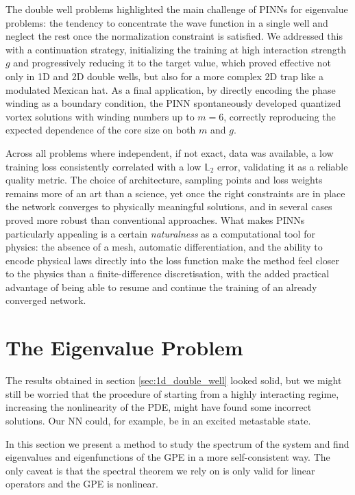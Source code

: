 \documentclass[a4paper, titlepage]{article}
\begin{document}
The double well problems highlighted the main challenge of PINNs for eigenvalue
problems: the tendency to concentrate the wave function in a single well and
neglect the rest once the normalization constraint is satisfied.
We addressed this with a continuation strategy, initializing the training at
high interaction strength $g$ and progressively reducing it to the target value,
which proved effective not only in 1D and 2D double wells, but also for a more 
complex 2D trap like a modulated Mexican hat.
As a final application, by directly encoding the phase winding as a boundary
condition, the PINN spontaneously developed quantized vortex solutions with
winding numbers up to $m = 6$, correctly reproducing the expected dependence
of the core size on both $m$ and $g$.

Across all problems where independent, if not exact, data was available, a low
training loss consistently correlated with a low $\mathbb{L}_2$ error, 
validating it as a reliable quality metric.
The choice of architecture, sampling points and loss weights remains more of an
art than a science, yet once the right constraints are in place the network
converges to physically meaningful solutions, and in several cases proved more
robust than conventional approaches.
What makes PINNs particularly appealing is a certain \emph{naturalness} as a
computational tool for physics: the absence of a mesh, automatic
differentiation, and the ability to encode physical laws directly into the loss
function make the method feel closer to the physics than a finite-difference
discretisation, with the added practical advantage of being able to resume and
continue the training of an already converged network.


\newpage
\appendix

\section{The Eigenvalue Problem} \label{app:eigenvalue}

The results obtained in section \ref{sec:1d_double_well} looked solid, but we
might still be worried that the procedure of starting from a highly interacting
regime, increasing the nonlinearity of the PDE, might have found some
incorrect solutions.
Our NN could, for example, be in an excited metastable state.

In this section we present a method to study the spectrum of the system and
find eigenvalues and eigenfunctions of the GPE in a more self-consistent way.
The only caveat is that the spectral theorem we rely on is only valid for linear
operators and the GPE is nonlinear.
\end{document}
